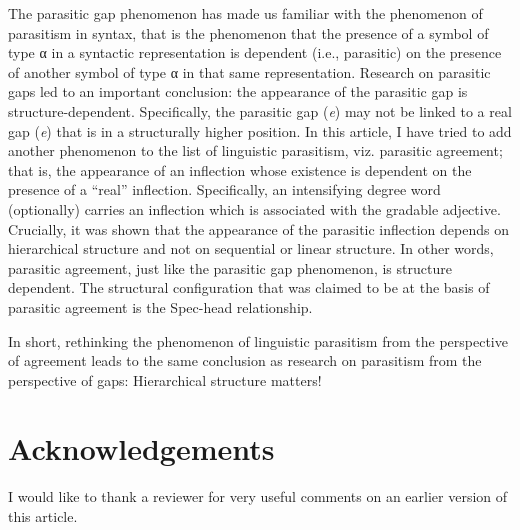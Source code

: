 \documentclass[output=paper]{langsci/langscibook}
\begin{document}
The parasitic gap phenomenon has made us familiar with the phenomenon of
parasitism in syntax, that is the phenomenon that the presence of a symbol of
type α in a syntactic representation is dependent (i.e., parasitic) on the
presence of another symbol of type α in that same representation. Research on
parasitic gaps led to an important conclusion: the appearance of the parasitic
gap is structure-dependent. Specifically, the parasitic gap
(\emph{e}\textsubscript{\Pg{}}) may not be linked to a real gap
(\emph{e}\textsubscript{\Rg{}}) that is in a structurally higher position. In
this article, I have tried to add another phenomenon to the list of linguistic
parasitism, viz. parasitic agreement; that is, the appearance of an inflection
whose existence is dependent on the presence of a \enquote{real} inflection.
Specifically, an intensifying degree word (optionally) carries an inflection
which is associated with the gradable adjective. Crucially, it was shown that
the appearance of the parasitic inflection depends on hierarchical structure
and not on sequential or linear structure. In other words, parasitic agreement,
just like the parasitic gap phenomenon, is structure dependent. The structural
configuration that was claimed to be at the basis of parasitic agreement is the
Spec-head relationship.

In short, rethinking the phenomenon of linguistic parasitism from the
perspective of agreement leads to the same conclusion as research on parasitism
from the perspective of gaps: Hierarchical structure matters!

\printchapterglossary{}

\section*{Acknowledgements}

I would like to thank a reviewer for very useful comments on an earlier version
of this article.

{\sloppy\printbibliography[heading=subbibliography,notkeyword=this]}
\end{document}

